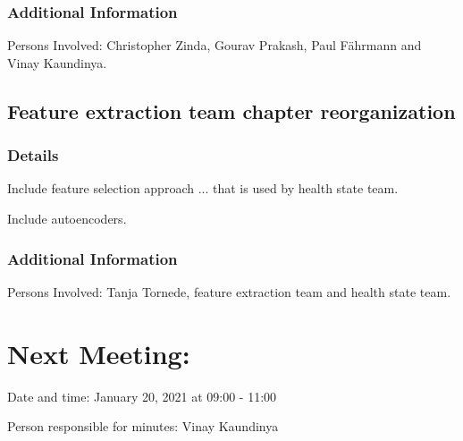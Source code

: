 \documentclass[11pt]{meetingmins} %
\begin{document}
\subsubsection{Additional Information}
\begin{hiddensubitems}
    \item
    Persons Involved: Christopher Zinda,
    Gourav Prakash, Paul Fährmann and Vinay Kaundinya.
\end{hiddensubitems}

\subsection{Feature extraction team chapter reorganization}
\subsubsection{Details}
\begin{hiddensubitems}
    \item
    Include feature selection approach ... that is used by
    health state team.
    \item
    Include autoencoders.
\end{hiddensubitems}

\subsubsection{Additional Information}
\begin{hiddensubitems}
    \item
    Persons Involved: Tanja Tornede, feature extraction team
    and health state team.
\end{hiddensubitems}


\section{Next Meeting:}
\begin{hiddensubitems}
    \item
    Date and time: January 20, 2021 at 09:00 - 11:00
    \item
    Person responsible for minutes: Vinay Kaundinya
\end{hiddensubitems}
\end{document}
